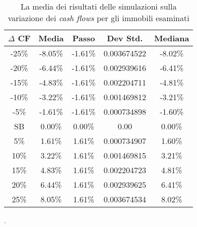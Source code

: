 \begin{table}[htbp]
\begin{center}
\begin{tabular}[c]{|c||*{4}{c|}}
\hline
$\Delta$ CF & Media & Passo & Dev Std. & Mediana \\
\hline \hline
-25\% & -8.05\% & -1.61\% & 0.003674522 & -8.02\% \\ \hline
-20\% & -6.44\% & -1.61\% & 0.002939616 & -6.41\% \\ \hline
-15\% & -4.83\% & -1.61\% & 0.002204711 & -4.81\% \\ \hline
-10\% & -3.22\% & -1.61\% & 0.001469812 & -3.21\% \\ \hline
-5\% & -1.61\% & -1.61\% & 0.000734898 & -1.60\% \\ \hline
SB & 0.00\% & 0.00\% & 0.00 & 0.00\% \\ \hline
5\% & 1.61\% & 1.61\% & 0.000734907 & 1.60\% \\ \hline
10\% & 3.22\% & 1.61\% & 0.001469815 & 3.21\% \\ \hline
15\% & 4.83\% & 1.61\% & 0.002204723 & 4.81\% \\ \hline
20\% & 6.44\% & 1.61\% & 0.002939625 & 6.41\% \\ \hline
25\% & 8.05\% & 1.61\% & 0.003674534 & 8.02\% \\ \hline
\end{tabular}
\caption[Media risultati di $\Delta$ CF]{La media dei risultati delle simulazioni sulla variazione dei {\itshape cash flows} per gli immobili esaminati}.
\label{tab:varvcfsintesi}
\end{center}
\end{table}
